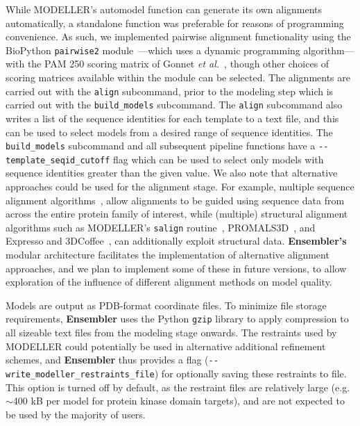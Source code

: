 \documentclass[aps,prl,preprint,nofootinbib,superscriptaddress,linenumbers]{revtex4-1}
\begin{document}
While MODELLER's automodel function can generate its own alignments automatically, a standalone function was preferable for reasons of programming convenience.
As such, we implemented pairwise alignment functionality using the BioPython {\tt pairwise2} module~\cite{cock:2009:biopython}---which uses a dynamic programming algorithm---with the PAM 250 scoring matrix of Gonnet \textit{et al.}~\cite{gonnet:science:1992:exhaustive-matching}, though other choices of scoring matrices available within the module can be selected.
The alignments are carried out with the {\tt align} subcommand, prior to the modeling step which is carried out with the {\tt build\_models} subcommand.
The {\tt align} subcommand also writes a list of the sequence identities for each template to a text file, and this can be used to select models from a desired range of sequence identities.
The {\tt build\_models} subcommand and all subsequent pipeline functions have a {\tt -{}-template\_seqid\_cutoff} flag which can be used to select only models with sequence identities greater than the given value.
We also note that alternative approaches could be used for the alignment stage.
For example, multiple sequence alignment algorithms~\cite{thompson:2011:msa-review}, allow alignments to be guided using sequence data from across the entire protein family of interest, while (multiple) structural alignment algorithms such as MODELLER's {\tt salign} routine~\cite{fiser:prot-sci:2000:modeller,sali:jmb:1993:modeller}, PROMALS3D~\cite{pei:2008:promals3d}, and Expresso and 3DCoffee~\cite{expresso,3dcoffee}, can additionally exploit structural data.
{\bf Ensembler's} modular architecture facilitates the implementation of alternative alignment approaches, and we plan to implement some of these in future versions, to allow exploration of the influence of different alignment methods on model quality.

Models are output as PDB-format coordinate files.
To minimize file storage requirements, {\bf Ensembler} uses the Python {\tt gzip} library to apply compression to all sizeable text files from the modeling stage onwards.
The restraints used by MODELLER could potentially be used in alternative additional refinement schemes, and {\bf Ensembler} thus provides a flag ({\tt -{}-write\_modeller\_restraints\_file}) for optionally saving these restraints to file.
This option is turned off by default, as the restraint files are relatively large (e.g.~$\sim$400 kB per model for protein kinase domain targets), and are not expected to be used by the majority of users.
\end{document}
